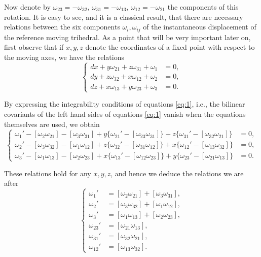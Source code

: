 \documentclass[leqno,12pt]{article}
\theoremstyle{shape1}
\theoremstyle{shape0}
\theoremstyle{shape2}
\theoremstyle{definition}
\begin{document}
Now denote by $\omega_{23}=-\omega_{32}$, $\omega_{31}=-\omega_{13}$, $\omega_{12}=-\omega_{21}$ the components of this rotation. It is easy to see, and it is a classical result, that there are necessary relations between the six components $\omega_{i},\omega_{ij}$ of the instantaneous displacement of the reference moving trihedral. As a point that will be very important later on, first observe that if $x,y,z$ denote the coordinates of a fixed point with respect to the moving axes, we have the relations
\begin{equation}
  \label{eq:1}
  \left\{
    \begin{aligned}
      dx+y\omega_{21}+z\omega_{31}+\omega_{1}&=0,\\
      dy+z\omega_{32}+x\omega_{12}+\omega_{2}&=0,\\
      dz+x\omega_{13}+y\omega_{23}+\omega_{3}&=0.
    \end{aligned}
  \right.
\end{equation}

By expressing the integrability conditions of equations \eqref{eq:1}, i.e., the bilinear covariants of the left hand sides of equations \eqref{eq:1} vanish when the equations themselves are used, we obtain
\[
\left\{\begin{aligned}
\omega_{1}'-[\omega_{2}\omega_{21}]-[\omega_{3}\omega_{31}]+y\{\omega_{21}'-[\omega_{23}\omega_{31}]\}+z\{\omega_{31}'-[\omega_{32}\omega_{21}]\}&=0,\\
\omega_{2}'-[\omega_{3}\omega_{32}]-[\omega_{1}\omega_{12}]+z\{\omega_{32}'-[\omega_{31}\omega_{12}]\}+x\{\omega_{12}'-[\omega_{13}\omega_{32}]\}&=0,\\
\omega_{3}'-[\omega_{1}\omega_{13}]-[\omega_{2}\omega_{23}]+x\{\omega_{13}'-[\omega_{12}\omega_{23}]\}+y\{\omega_{23}'-[\omega_{21}\omega_{13}]\}&=0.\end{aligned}
\right.
\]

These relations hold for any $x,y,z$, and hence we deduce the relations we are after
\begin{equation}
  \label{eq:2}
  \left\{
    \begin{aligned}
      \omega_{1}'&=[\omega_{2}\omega_{21}]+[\omega_{3}\omega_{31}],\\
      \omega_{2}'&=[\omega_{3}\omega_{32}]+[\omega_{1}\omega_{12}],\\
      \omega_{3}'&=[\omega_{1}\omega_{13}]+[\omega_{2}\omega_{23}],\\
      \omega_{23}'&=[\omega_{21}\omega_{13}],\\
      \omega_{31}'&=[\omega_{32}\omega_{21}],\\
      \omega_{12}'&=[\omega_{13}\omega_{32}].
    \end{aligned}
  \right.
\end{equation}
\end{document}
